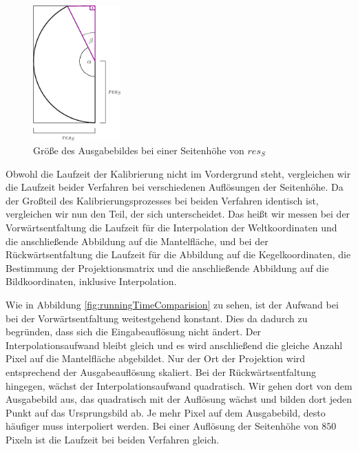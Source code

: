 \begin{figure}[!htb]
	\centering
	\includegraphics[width=0.3\textwidth]{images/sizeOutput.eps}
	\caption{Größe des Ausgabebildes bei einer Seitenhöhe von $res_S$}
	\label{fig:sizeOutput}
\end{figure}


Obwohl die Laufzeit der Kalibrierung nicht im Vordergrund steht, vergleichen wir die Laufzeit beider Verfahren bei verschiedenen Auflösungen der Seitenhöhe. Da der Großteil des Kalibrierungsprozesses bei beiden Verfahren identisch ist, vergleichen wir nun den Teil, der sich unterscheidet. Das heißt wir messen bei der Vorwärtsentfaltung die Laufzeit für die Interpolation der Weltkoordinaten und die anschließende Abbildung auf die Mantelfläche, und bei der Rückwärtsentfaltung die Laufzeit für die Abbildung auf die Kegelkoordinaten, die Bestimmung der Projektionsmatrix und die anschließende Abbildung auf die Bildkoordinaten, inklusive Interpolation.


Wie in Abbildung \ref{fig:runningTimeComparision} zu sehen, ist der Aufwand bei bei der Vorwärtsentfaltung weitestgehend konstant. Dies da dadurch zu begründen, dass sich die Eingabeauflösung nicht ändert. Der Interpolationsaufwand bleibt gleich und es wird anschließend die gleiche Anzahl Pixel auf die Mantelfläche abgebildet. Nur der Ort der Projektion wird entsprechend der Ausgabeauflösung skaliert.
Bei der Rückwärtsentfaltung hingegen, wächst der Interpolationsaufwand quadratisch. Wir gehen dort von dem Ausgabebild aus, das quadratisch mit der Auflösung wächst und bilden dort jeden Punkt auf das Ursprungsbild ab. Je mehr Pixel auf dem Ausgabebild, desto häufiger muss interpoliert werden. Bei einer Auflösung der Seitenhöhe von $850$ Pixeln ist die Laufzeit bei beiden Verfahren gleich.

